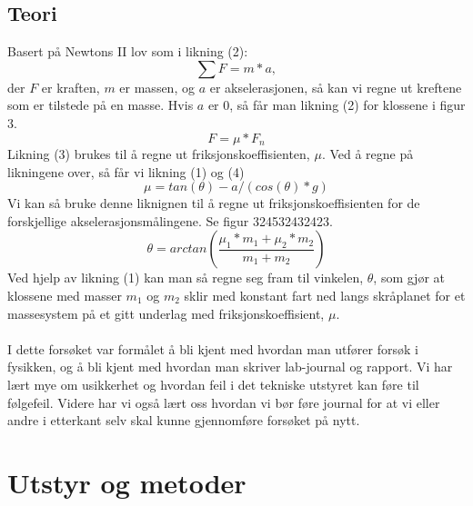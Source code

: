 \documentclass[10pt,a4paper]{report}
\begin{document}
\section*{Teori}
Basert på Newtons II lov som i likning (2): 
\begin{equation}
\sum{F} = m*a,
\end{equation} der $F$ er kraften, $m$ er massen, og $a$ er akselerasjonen, så kan vi regne ut kreftene som er tilstede på en masse. Hvis $a$ er 0, så får man likning (2) for klossene i figur 3. 
\begin{equation}
F = \mu *F_n
\end{equation}
Likning (3) brukes til å regne ut friksjonskoeffisienten, $\mu$. Ved å regne på likningene over, så får vi likning (1) og (4)
\begin{equation}
\mu = tan(\theta)-a/(cos(\theta)*g)
\end{equation}
Vi kan så bruke denne liknignen til å regne ut friksjonskoeffisienten for de forskjellige akselerasjonsmålingene. Se figur 324532432423. 
\begin{equation}
\theta = arctan(\frac{\mu_1*m_1+\mu_2*m_2}{m_1+m_2})
\end{equation}
Ved hjelp av likning (1) kan man så regne seg fram til vinkelen, $\theta$, som gjør at klossene med masser $m_1$ og $m_2$ sklir med konstant fart ned langs skråplanet for et massesystem på et gitt underlag med friksjonskoeffisient, $\mu$.\\
\\I dette forsøket var formålet å bli kjent med hvordan man utfører forsøk i fysikken, og å bli kjent med hvordan man skriver lab-journal og rapport. Vi har lært mye om usikkerhet og hvordan feil i det tekniske utstyret kan føre til følgefeil. Videre har vi også lært oss hvordan vi bør føre journal for at vi eller andre i etterkant selv skal kunne gjennomføre forsøket på nytt.

\chapter*{Utstyr og metoder}
\end{document}
